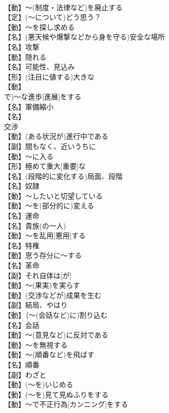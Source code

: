 \documentclass[8pt]{extreport}
\begin{document}
\begin{CJK}{UTF8}{min}
\\	【動】～(制度・法律など)を廃止する
\\	【定】(～について)どう思う？
\\	【動】～を探し求める
\\	【名】(悪天候や爆撃などから身を守る)安全な場所
\\	【名】攻撃
\\	【動】隠れる
\\	【名】可能性、見込み
\\	【形】(注目に値する)大きな
\\	【動】
\\	で)～な進歩[進展]をする
\\	【名】軍備縮小
\\	【名】
\\	交渉
\\	【動】(ある状況が)進行中である
\\	【副】間もなく、近いうちに
\\	【動】～に入る
\\	【形】極めて重大[重要]な
\\	【名】(段階的に変化する)局面、段階
\\	【名】奴隷
\\	【動】～したいと切望している
\\	【動】～を(部分的に)変える
\\	【名】運命
\\	【名】貴族(の一人)
\\	【動】～を乱用[悪用]する
\\	【名】特権
\\	【動】思う存分に～する
\\	【名】革命
\\	【副】それ自体は[が]
\\	【動】～(果実)を実らす
\\	【動】(交渉などが)成果を生む
\\	【副】結局、やはり
\\	【動】（～(会話など)に)割り込む
\\	【名】会話
\\	【動】～(意見など)に反対である
\\	【動】～を無視する
\\	【動】～(順番など)を飛ばす
\\	【名】順番
\\	【副】わざと
\\	【動】(～を)いじめる
\\	【動】(～を)見て見ぬふりをする
\\	【動】～で不正行為[カンニング]をする

\end{CJK}
\end{document}
